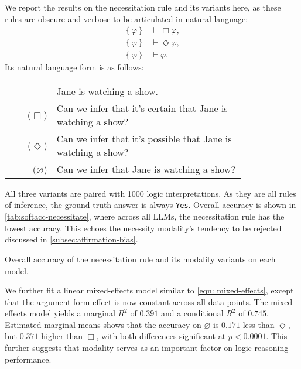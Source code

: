 We report the results on the necessitation rule and its variants here, as these rules are obscure and verbose to be articulated in natural language:
%
\begin{align}
    \left\{\varphi\right\} &\vdash \Box \varphi, \tag{necessitation rule} \label{eqn:necessitation-rule} \\
    \left\{\varphi\right\} &\vdash \Diamond \varphi, \nonumber \\
    \left\{\varphi\right\} &\vdash \varphi. \nonumber
\end{align}
%
Its natural language form is as follows:
\begin{table}[H]
    \small
    \begin{tabular}{rp{0.8\linewidth}}
    & Jane is watching a show.\\
    ($\Box$) & Can we infer that it's certain that Jane is watching a show?\\
    ($\Diamond$) & Can we infer that it's possible that Jane is watching a show?\\
    ($\varnothing$) & Can we infer that Jane is watching a show?\\
    \end{tabular}
\end{table}

All three variants are paired with 1000 logic interpretations.
As they are all rules of inference, the ground truth answer is always \texttt{Yes}.
Overall accuracy is shown in \cref{tab:softacc-necessitate},
where across all LLMs, the necessitation rule has the lowest accuracy.
This echoes the necessity modality's tendency to be rejected discussed in \cref{subsec:affirmation-bias}.

\begin{table}[t]
    
    \caption{
        \label{tab:softacc-necessitate}
        Overall accuracy of the necessitation rule and its modality variants on each model.
    }
\end{table}
    
We further fit a linear mixed-effects model similar to \cref{eqn: mixed-effects}, except that the argument form effect is now constant across all data points.
The mixed-effects model yields a marginal $R^2$ of $0.391$ and a conditional $R^2$ of $0.745$.
Estimated marginal means shows that the accuracy on $\varnothing$ is $0.171$ less than $\Diamond$, but $0.371$ higher than $\Box$, with both differences significant at $p < 0.0001$.
This further suggests that modality serves as an important factor on logic reasoning performance.

